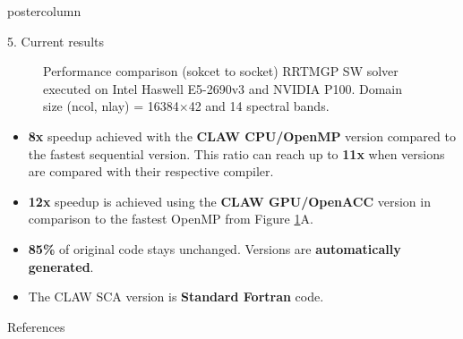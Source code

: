 \documentclass{beamer}
\begin{document}
\begin{frame}
\begin{columns}
\begin{column}{.38\textwidth}
\begin{beamercolorbox}[center]{postercolumn}
\begin{minipage}{.98\textwidth}
{\begin{myblock}{5. Current results}
\begin{figure}[ht]
  \caption[Performance comparison RRTMGP SW solver]{Performance comparison
  (sokcet to socket) RRTMGP SW solver executed on Intel Haswell E5-2690v3 and
  NVIDIA P100. Domain size (ncol, nlay) = 16384$\times$42 and 14 spectral bands.
  }
  \label{fig:perf_sw}
\end{figure}

\begin{itemize}
  \item \textbf{8x} speedup achieved with the \textbf{CLAW CPU/OpenMP} version
        compared to the fastest sequential version. This ratio can reach up to
        \textbf{11x} when versions are compared with their respective compiler.
  \item \textbf{12x} speedup is achieved using the \textbf{CLAW GPU/OpenACC}
        version in comparison to the fastest OpenMP from
        Figure \ref{fig:perf_sw}A.
  \item \textbf{85\%} of original code stays unchanged. Versions are
        \textbf{automatically generated}.
  \item The CLAW SCA version is \textbf{Standard Fortran} code.
\end{itemize}

\end{myblock}%

%
%
\begin{myblock}{References}
\footnotesize


\end{myblock}\vfill







}\end{minipage}\end{beamercolorbox}
\end{column}
\end{columns}
\end{frame}
\end{document}
